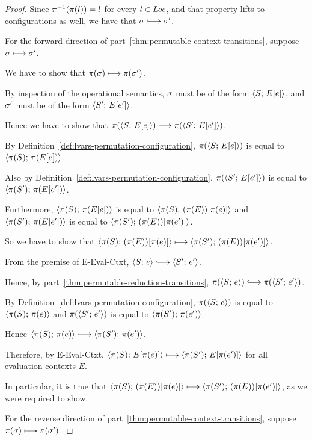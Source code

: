 \begin{proof}
  Since $\pi^{-1}(\pi(l)) = l$ for every $l \in \mathit{Loc}$, and that property
  lifts to configurations as well, we have that $\conf \parstepsto
  \conf'$.

  For the forward direction of
  part~\ref{thm:permutable-context-transitions}, suppose $\sigma
  \longmapsto \sigma'$.

  We have to show that $\pi(\sigma) \longmapsto \pi(\sigma')$.

  By inspection of the operational semantics, $\sigma$ must be of the
  form $\langle S;\, E\hspace{-0.5mm}\left[e\right] \rangle$, and $\sigma'$ must be of the form
  $\langle S';\, E\hspace{-0.5mm}\left[e'\right] \rangle$.

  Hence we have to show that $\pi(\langle S;\, E\hspace{-0.5mm}\left[e\right] \rangle) \longmapsto
  \pi(\langle S';\, E\hspace{-0.5mm}\left[e'\right] \rangle)$.

  By Definition~\ref{def:lvars-permutation-configuration},
  $\pi(\langle S;\, E\hspace{-0.5mm}\left[e\right] \rangle)$ is equal to $\langle \pi(S);\, \pi(E\hspace{-0.5mm}\left[e\right]) \rangle$.

  Also by Definition~\ref{def:lvars-permutation-configuration},
  $\pi(\langle S';\, E\hspace{-0.5mm}\left[e'\right] \rangle)$ is equal to
  $\langle \pi(S');\, \pi(E\hspace{-0.5mm}\left[e'\right]) \rangle$.

  Furthermore, $\langle \pi(S);\, \pi(E\hspace{-0.5mm}\left[e\right]) \rangle$ is equal to
  $\langle \pi(S);\, (\pi(E))\hspace{-0.5mm}\left[\pi(e)\right] \rangle$ and
  $\langle \pi(S');\, \pi(E\hspace{-0.5mm}\left[e'\right]) \rangle$ is equal to
  $\langle \pi(S');\, (\pi(E))\hspace{-0.5mm}\left[\pi(e')\right] \rangle$.

  So we have to show that
  $\langle \pi(S);\, (\pi(E))\hspace{-0.5mm}\left[\pi(e)\right] \rangle \longmapsto
  \langle \pi(S');\, (\pi(E))\hspace{-0.5mm}\left[\pi(e')\right] \rangle$.

  From the premise of {\sc E-Eval-Ctxt}, $\config{S}{e} \parstepsto
  \config{S'}{e'}$.

  Hence, by part~\ref{thm:permutable-reduction-transitions},
  $\pi(\config{S}{e}) \parstepsto \pi(\config{S'}{e'})$.

  By Definition~\ref{def:lvars-permutation-configuration},
  $\pi(\langle S;\, e \rangle)$ is equal to $\langle \pi(S);\, \pi(e) \rangle$ and
  $\pi(\langle S';\, e' \rangle)$ is equal to $\langle \pi(S');\, \pi(e') \rangle$.

  Hence $\config{\pi(S)}{\pi(e)} \parstepsto
  \config{\pi(S')}{\pi(e')}$.

  Therefore, by {\sc E-Eval-Ctxt}, $\langle \pi(S);\, E\hspace{-0.5mm}\left[\pi(e)\right] \rangle
  \longmapsto \langle \pi(S');\, E\hspace{-0.5mm}\left[\pi(e')\right] \rangle$ for all evaluation
  contexts $E$.

  In particular, it is true that
  $\langle \pi(S);\, (\pi(E))\hspace{-0.5mm}\left[\pi(e)\right] \rangle \longmapsto
  \langle \pi(S');\, (\pi(E))\hspace{-0.5mm}\left[\pi(e')\right] \rangle$, as we were required
  to show.

  For the reverse direction of
  part~\ref{thm:permutable-context-transitions}, suppose $\pi(\sigma)
  \longmapsto \pi(\sigma')$.


\end{proof}
